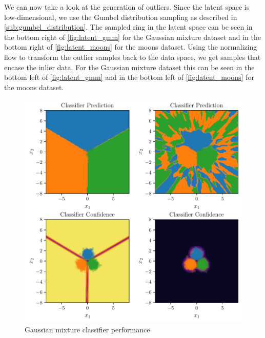 We can now take a look at the generation of outliers. Since the latent space is
low-dimensional, we use the Gumbel distribution sampling as described in
\autoref{sub:gumbel_distribution}. The sampled ring in
the latent space can be seen in the bottom right of \autoref{fig:latent_gmm} for the
Gaussian mixture dataset and in the bottom right of \autoref{fig:latent_moons} for the
moons dataset. Using the normalizing flow to transform the outlier samples back
to the data space, we get samples that encase the inlier data. For the Gaussian
mixture dataset this can be seen in the bottom left of \autoref{fig:latent_gmm} and
in the bottom left of \autoref{fig:latent_moons} for the moons dataset.

\begin{figure}[htpb]
	\centering
        \includegraphics{figures/toy_example/gaussian_mixture/classifier.pdf}
	\caption{Gaussian mixture classifier performance}%
	\label{fig:classifier_gmm}
\end{figure}

